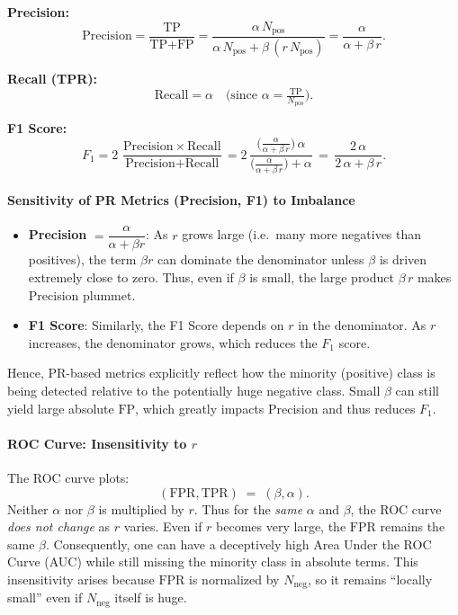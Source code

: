 \bigskip
\noindent
\textbf{Precision:}
\[
\text{Precision} 
= \frac{\text{TP}}{\text{TP} + \text{FP}}
= \frac{\alpha\, N_{\text{pos}}}{\alpha\,N_{\text{pos}} + \beta \,(r\, N_{\text{pos}})}
= \frac{\alpha}{\alpha + \beta\,r}.
\]

\noindent
\textbf{Recall (TPR):}
\[
\text{Recall} = \alpha \quad\text{(since } \alpha = \tfrac{\text{TP}}{N_{\text{pos}}}\text{)}.
\]

\noindent
\textbf{F1 Score:}
\[
F_{1}
= 2 \,\frac{\text{Precision}\,\times\,\text{Recall}}{\text{Precision} + \text{Recall}}
= 2 \,\frac{\bigl(\tfrac{\alpha}{\alpha + \beta\,r}\bigr)\,\alpha} 
{\bigl(\tfrac{\alpha}{\alpha + \beta\,r}\bigr) + \alpha}
\,=\,
\frac{2\,\alpha}{2\,\alpha + \beta\,r}.
\]

\bigskip
\paragraph{Sensitivity of PR Metrics (Precision, F1) to Imbalance}

\begin{itemize}
    \item \textbf{Precision} \(= \dfrac{\alpha}{\alpha + \beta r}\):
    As \(r\) grows large (i.e.\ many more negatives than positives), the term \(\beta r\) can dominate the denominator unless \(\beta\) is driven extremely close to zero. Thus, even if \(\beta\) is small, the large product \(\beta\,r\) makes Precision plummet. 
    \item \textbf{F1 Score}: 
    Similarly, the F1 Score depends on \(r\) in the denominator. As \(r\) increases, the denominator grows, which reduces the \(F_1\) score.
\end{itemize}

Hence, PR-based metrics explicitly reflect how the minority (positive) class is being detected relative to the potentially huge negative class. Small \(\beta\) can still yield large absolute \(\text{FP}\), which greatly impacts Precision and thus reduces \(F_1\).

\medskip
\paragraph{ROC Curve: Insensitivity to \(r\)}

The ROC curve plots:
\[
(\text{FPR}, \text{TPR}) \;=\; (\beta, \alpha).
\]
Neither \(\alpha\) nor \(\beta\) is multiplied by \(r\). Thus for the \emph{same} \(\alpha\) and \(\beta\), the ROC curve \emph{does not change} as \(r\) varies. Even if \(r\) becomes very large, the \(\text{FPR}\) remains the same \(\beta\). Consequently, one can have a deceptively high Area Under the ROC Curve (AUC) while still missing the minority class in absolute terms. This insensitivity arises because \(\text{FPR}\) is normalized by \(N_{\text{neg}}\), so it remains “locally small” even if \(N_{\text{neg}}\) itself is huge.

